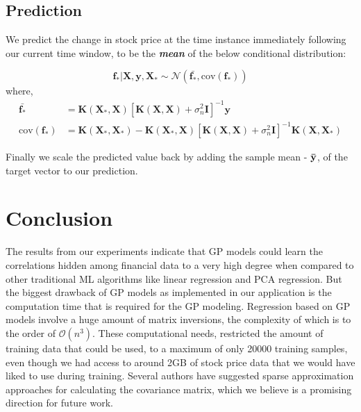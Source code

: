 \documentclass{article} %
\begin{document}
\subsection{Prediction}

We predict the change in stock price at the time instance immediately following our current time window, to be the \textbf{\textit{mean}} of the below conditional distribution:

\begin{equation}
 \boldsymbol{f_*} | \boldsymbol{X}, \boldsymbol{y}, \boldsymbol{X_*} \sim \mathcal{N}\left(\bar{\boldsymbol{f_*}}, \mbox{cov}(\boldsymbol{f_*})\right)
\end{equation}
where,
\begin{align}
\bar{\boldsymbol{f_*}} &= \boldsymbol{K}\left(\boldsymbol{X_*}, \boldsymbol{X}\right) \left[ \boldsymbol{K}\left(\boldsymbol{X}, \boldsymbol{X}\right) + \sigma_n^2\boldsymbol{I}\right]^{-1} \boldsymbol{y} \\
\mbox{cov}(\boldsymbol{f_*}) &= \boldsymbol{K}\left(\boldsymbol{X_*}, \boldsymbol{X_*}\right) - \boldsymbol{K}\left(\boldsymbol{X_*}, \boldsymbol{X}\right) \left[ \boldsymbol{K}\left(\boldsymbol{X}, \boldsymbol{X}\right) + \sigma_n^2\boldsymbol{I}\right]^{-1} \boldsymbol{K}\left(\boldsymbol{X}, \boldsymbol{X_*}\right)
\end{align}


Finally we scale the predicted value back by adding the sample mean - $\bf\bar{y}$, of the target vector to our prediction.

\section{Conclusion}

The results from our experiments indicate that GP models could learn the correlations hidden among financial data to a very high degree when compared to other traditional ML algorithms like linear regression and PCA regression. But the biggest drawback of GP models as implemented in our application is the computation time that is required for the GP modeling. Regression based on GP models involve a huge amount of matrix inversions, the complexity of which is to the order of $\mathcal{O}(n^3)$. These computational needs, restricted the amount of training data that could be used, to a maximum of only 20000 training samples, even though we had access to around 2GB of stock price data that we would have liked to use during training. Several authors have suggested sparse approximation approaches for calculating the covariance matrix, which we believe is a promising direction for future work. 
\end{document}

